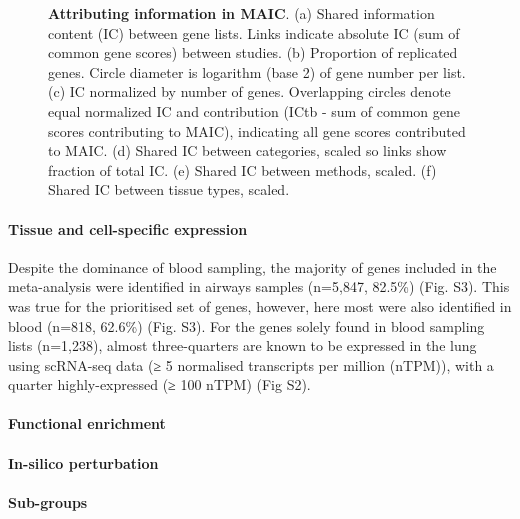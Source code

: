 \documentclass[
  11,
  a4paper,
]{article}
\let\oldparagraph\paragraph
\renewcommand{\paragraph}[1]{\oldparagraph{#1}\mbox{}}
\begin{document}
\begin{figure}
{}

\caption{\label{fig-fig2}\textbf{Attributing information in MAIC}. (a)
Shared information content (IC) between gene lists. Links indicate
absolute IC (sum of common gene scores) between studies. (b) Proportion
of replicated genes. Circle diameter is logarithm (base 2) of gene
number per list. (c) IC normalized by number of genes. Overlapping
circles denote equal normalized IC and contribution (ICtb - sum of
common gene scores contributing to MAIC), indicating all gene scores
contributed to MAIC. (d) Shared IC between categories, scaled so links
show fraction of total IC. (e) Shared IC between methods, scaled. (f)
Shared IC between tissue types, scaled.}

\end{figure}

\hypertarget{tissue-and-cell-specific-expression}{%
\paragraph{Tissue and cell-specific
expression}\label{tissue-and-cell-specific-expression}}

Despite the dominance of blood sampling, the majority of genes included
in the meta-analysis were identified in airways samples (n=5,847,
82.5\%) (Fig. S3). This was true for the prioritised set of genes,
however, here most were also identified in blood (n=818, 62.6\%) (Fig.
S3). For the genes solely found in blood sampling lists (n=1,238),
almost three-quarters are known to be expressed in the lung using
scRNA-seq data (≥ 5 normalised transcripts per million (nTPM)), with a
quarter highly-expressed (≥ 100 nTPM) (Fig S2).

\hypertarget{functional-enrichment}{%
\paragraph{Functional enrichment}\label{functional-enrichment}}

\hypertarget{in-silico-perturbation}{%
\paragraph{In-silico perturbation}\label{in-silico-perturbation}}

\hypertarget{sub-groups}{%
\paragraph{Sub-groups}\label{sub-groups}}
\end{document}
